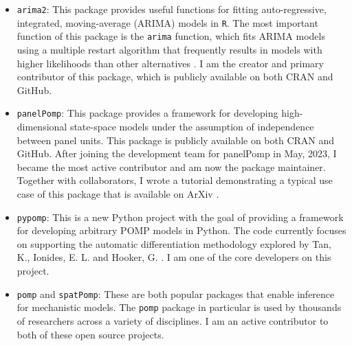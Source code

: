 \documentclass{article}
\begin{document}
\begin{itemize}

      \item \texttt{arima2}: This package provides useful functions for fitting auto-regressive, integrated, moving-average (ARIMA) models in \texttt{R}. The most important function of this package is the \texttt{arima} function, which fits ARIMA models using a multiple restart algorithm that frequently results in models with higher likelihoods than other alternatives \cite{wheelerARMA}.
    I am the creator and primary contributor of this package, which is publicly available on both CRAN and GitHub.

    \item \texttt{panelPomp}: This package provides a framework for developing high-dimensional state-space models under the assumption of independence between panel units.
    This package is publicly available on both CRAN and GitHub.
    After joining the development team for panelPomp in May, 2023, I became the most active contributor and am now the package maintainer.
    Together with collaborators, I wrote a tutorial demonstrating a typical use case of this package that is available on ArXiv \cite{breto24}.

    \item \texttt{pypomp}: This is a new Python project with the goal of providing a framework for developing arbitrary POMP models in Python. The code currently focuses on supporting the automatic differentiation methodology explored by Tan, K., Ionides, E. L. and Hooker, G. \cite{tan24}. I am one of the core developers on this project.

    \item \texttt{pomp} and \texttt{spatPomp}: These are both popular packages that enable inference for mechanistic models. The \texttt{pomp} package in particular is used by thousands of researchers across a variety of disciplines. I am an active contributor to both of these open source projects.

\end{itemize}



\end{document}
